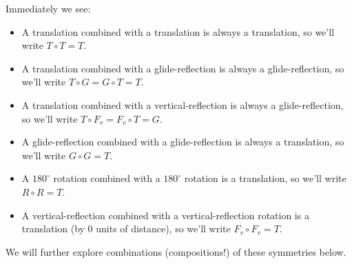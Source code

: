 \documentclass[noauthor,nooutcomes,hints        ]{ximera}
\begin{document}
Immediately we see:
\begin{itemize}
\item A translation combined with a translation is always a
  translation, so we'll write $T\circ T = T$.
\item A translation combined with a glide-reflection is always a
  glide-reflection, so we'll write $T\circ G = G \circ T = T$.
\item A translation combined with a vertical-reflection is always a
  glide-reflection, so we'll write $T\circ F_v = F_v \circ T = G$.
\item A glide-reflection combined with a glide-reflection is always a
  translation, so we'll write $G\circ G = T$.
\item A $180^\circ$ rotation combined with a $180^\circ$ rotation is a
  translation, so we'll write $R\circ R = T$.
\item A vertical-reflection combined with a vertical-reflection
  rotation is a translation (by $0$ units of distance), so we'll write
  $F_v\circ F_v = T$.
\end{itemize}


We will further explore combinations (compositions!) of these symmetries below.



\mynewpage
\end{document}
